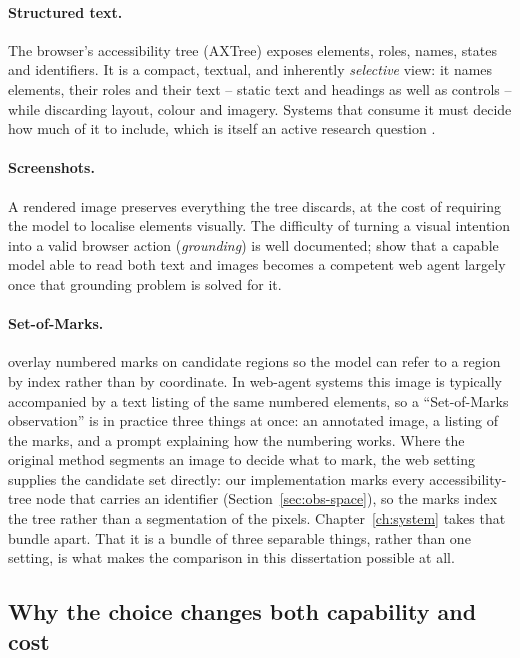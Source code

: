 \paragraph{Structured text.} The browser's accessibility tree (AXTree) exposes
elements, roles, names, states and identifiers. It is a compact, textual, and
inherently \emph{selective} view: it names elements, their roles and their
text -- static text and headings as well as controls -- while discarding layout,
colour and imagery. Systems that consume it must decide how much of it
to include, which is itself an active research question
\citep{deng2023mind2web, lu2024weblinx}.

\paragraph{Screenshots.} A rendered image preserves everything the tree
discards, at the cost of requiring the model to localise elements visually. The
difficulty of turning a visual intention into a valid browser action (\emph{grounding}) is well documented; \citet{zheng2024gpt4v}
show that a capable model able to read both text and images becomes a
competent web agent largely once that grounding problem is solved for it.

\paragraph{Set-of-Marks.} \citet{yang2023som} overlay numbered marks on
candidate regions so the model can refer to a region by index rather than by
coordinate. In web-agent systems this image is typically accompanied by a text
listing of the same numbered elements, so a ``Set-of-Marks observation'' is in
practice three things at once: an annotated image, a listing of the marks, and
a prompt explaining how the numbering works. Where the original method segments
an image to decide what to mark, the web setting supplies the candidate set
directly: our implementation marks every accessibility-tree node that carries an
identifier (Section~\ref{sec:obs-space}), so the marks index the tree rather
than a segmentation of the pixels. Chapter~\ref{ch:system} takes that bundle apart. That
it is a bundle of three separable things, rather than one setting, is what
makes the comparison in this dissertation possible at all.

\subsection{Why the choice changes both capability and cost}

